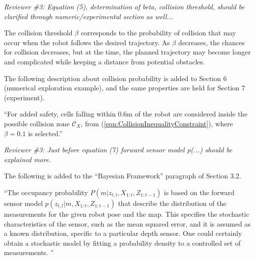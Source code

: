 \documentclass[11pt]{article}
\newcommand{\refeqn}[1]{(\ref{eqn:#1})}
\newenvironment{correction}{\begin{list}{}{\setlength{\leftmargin}{1cm}\setlength{\rightmargin}{1cm}}\vspace{\parsep}\item[]``}{''\end{list}}
\begin{document}
\begin{itemize}\setlength{\itemsep}{2\parsep}

\item {\itshape Reviewer \#3: Equation (5), determination of beta, collision threshold, should be clarified through numeric/experimental section as well...}

The collision threshold $\beta$ corresponds to the probability of collision that may occur when the robot follows the desired trajectory. As $\beta$ decreases, the chances for collision decreases, but at the time, the planned trajectory may become longer and complicated while keeping a distance from potential obstacles. 



The following description about collision probability is added to Section 6 (numerical exploration example), and the same properties are held for Section 7 (experiment).
\begin{correction}For added safety, cells falling within $0.6$m of the robot are considered inside the possible collision zone $\mathcal{C}_X$, from \refeqn{CollisionInequalityConstraint}, where $\beta=0.1$ is selected.\end{correction}


\item {\itshape Reviewer \#3: Just before equation (7) forward sensor model p(...) should be explained more.}

The following is added to the ``Bayesian Framework'' paragraph of Section 3.2.

\begin{correction}The occupancy probability $P(m|z_{t,l},X_{1:t},Z_{1:t-1})$ is based on the forward sensor model $p(z_{t,l}|m,X_{1:t},Z_{1:t-1})$ that describe the distribution of the measurements for the given robot pose and the map. This specifies the stochastic characteristics of the sensor, such as the mean squared error, and it is assumed as a known distribution, specific to a particular depth sensor. One could certainly obtain a stochastic model by fitting a probability density to a controlled set of measurements.
\end{correction}


\end{itemize}
\end{document}

